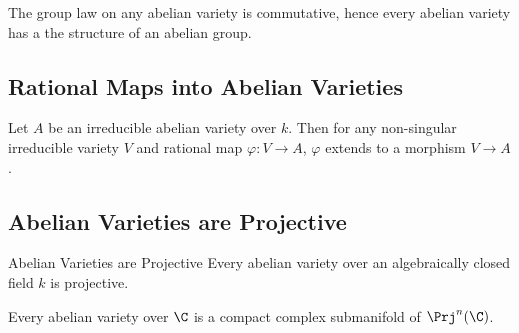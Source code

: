\documentclass[a4paper]{article}
\begin{document}
\begin{crl}{}{} The group law on any abelian variety is commutative, hence every abelian variety has a the structure of an abelian group. 
\end{crl}

\subsection{Rational Maps into Abelian Varieties}
\begin{thm}{}{} Let $A$ be an irreducible abelian variety over $k$. Then for any non-singular irreducible variety $V$ and rational map $\varphi:V\to A$, $\varphi$ extends to a morphism $V\to A$. 
\end{thm}

\subsection{Abelian Varieties are Projective}
\begin{thm}{Abelian Varieties are Projective}{} Every abelian variety over an algebraically closed field $k$ is projective. 
\end{thm}

\begin{thm}{}{} Every abelian variety over $\C$ is a compact complex submanifold of $\Prj^n(\C)$. 
\end{thm}
\end{document}
